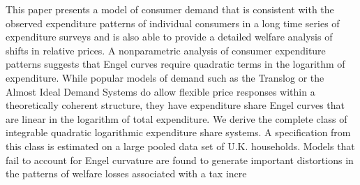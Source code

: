 This paper presents a model of consumer demand that is consistent with the observed expenditure patterns of individual consumers in a long time series of expenditure surveys and is also able to provide a detailed welfare analysis of shifts in relative prices. A nonparametric analysis of consumer expenditure patterns suggests that Engel curves require quadratic terms in the logarithm of expenditure. While popular models of demand such as the Translog or the Almost Ideal Demand Systems do allow flexible price responses within a theoretically coherent structure, they have expenditure share Engel curves that are linear in the logarithm of total expenditure. We derive the complete class of integrable quadratic logarithmic expenditure share systems. A specification from this class is estimated on a large pooled data set of U.K. households. Models that fail to account for Engel curvature are found to generate important distortions in the patterns of welfare losses associated with a tax incre
